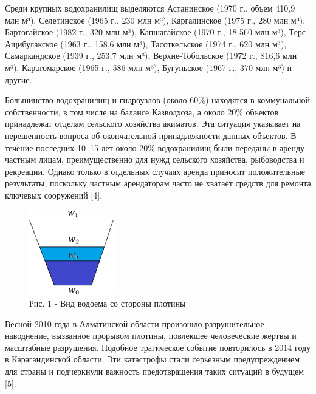 \begin{multicols}{2}
Среди крупных водохранилищ выделяются Астанинское (1970 г., объем 410,9
млн м³), Селетинское (1965 г., 230 млн м³), Каргалинское (1975 г., 280
млн м³), Бартогайское (1982 г., 320 млн м³), Капшагайское (1970 г., 18
560 млн м³), Терс-Ащибулакское (1963 г., 158,6 млн м³), Тасоткельское
(1974 г., 620 млн м³), Самаркандское (1939 г., 253,7 млн м³),
Верхне-Тобольское (1972 г., 816,6 млн м³), Каратомарское (1965 г., 586
млн м³), Бугуньское (1967 г., 370 млн м³) и другие.

Большинство водохранилищ и гидроузлов (около 60\%) находятся в
коммунальной собственности, в том числе на балансе Казводхоза, а около
20\% объектов принадлежат отделам сельского хозяйства акиматов. Эта
ситуация указывает на нерешенность вопроса об окончательной
принадлежности данных объектов. В течение последних 10--15 лет около
20\% водохранилищ были переданы в аренду частным лицам, преимущественно
для нужд сельского хозяйства, рыбоводства и рекреации. Однако только в
отдельных случаях аренда приносит положительные результаты, поскольку
частным арендаторам часто не хватает средств для ремонта ключевых
сооружений {[}4{]}.

\begin{figure}[H]
	\centering
	\includegraphics[width=0.6\columnwidth]{media/ict/image2}
	\caption*{Рис. 1 - Вид водоема со стороны плотины}
\end{figure}

Весной 2010 года в Алматинской области произошло разрушительное
наводнение, вызванное прорывом плотины, повлекшее человеческие жертвы и
масштабные разрушения. Подобное трагическое событие повторилось в 2014
году в Карагандинской области. Эти катастрофы стали серьезным
предупреждением для страны и подчеркнули важность предотвращения таких
ситуаций в будущем {[}5{]}.


\end{multicols}
